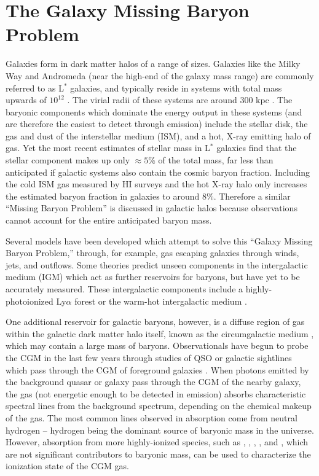 \section{The Galaxy Missing Baryon Problem}
\label{sec:Missing.Galaxies}

Galaxies form in dark matter halos of a range of sizes. Galaxies like
the Milky Way and Andromeda (near the high-end of the galaxy mass
range) are commonly referred to as L$^*$ galaxies, and typically
reside in systems with total mass upwards of $10^{12}$ \Msun{}
\citep{Moster2010}. The virial radii of these systems are around 300
kpc \citep[][and refs.~therein]{Werk2014}. The baryonic components
which dominate the energy output in these systems (and are therefore
the easiest to detect through emission) include the stellar disk, the
gas and dust of the interstellar medium (ISM), and a hot, X-ray
emitting halo of gas. Yet the most recent estimates of stellar mass in
L$^*$ galaxies \citep{Behroozi2010} find that the stellar component
makes up only $\approx5\%$ of the total mass, far less than
anticipated if galactic systems also contain the cosmic baryon
fraction. Including the cold ISM gas measured by HI surveys and the
hot X-ray halo \citep[][respectively]{Martin2010, Gupta2012} only
increases the estimated baryon fraction in galaxies to around
$8\%$. Therefore a similar ``Missing Baryon Problem'' is discussed in
galactic halos because observations cannot account for the entire
anticipated baryon mass. 

Several models have been developed which attempt to solve this
``Galaxy Missing Baryon Problem,'' through, for example, gas
escaping galaxies through winds, jets, and outflows. Some theories
predict unseen components in the intergalactic medium (IGM) which act
as further reservoirs for baryons, but have yet to be accurately
measured. These intergalactic components include a highly-photoionized
Ly$\alpha$ forest \citep{Sargent1980, Cen1994} or the warm-hot
intergalactic medium \citep[WHIM][]{Cen1999, Dave1999}. 

One additional reservoir for galactic baryons, however, is a diffuse
region of gas within the galactic dark matter halo itself, known as
the circumgalactic medium \citep[CGM, first suggested
  by][]{Bahcall1969, Bergeron1985, Lanzetta1995}, which may contain a
large mass of baryons. Observationals have begun to probe the
CGM in the last few years through studies of QSO or galactic
sightlines which pass through the CGM of foreground
galaxies \citep{Steidel2010, Prochaska2011, Tumlinson2011,
  Werk2013}. When photons emitted by the background quasar or galaxy
pass through the CGM of the nearby galaxy, the gas (not energetic
enough to be detected in emission) absorbs characteristic spectral
lines from the background spectrum, depending on the chemical makeup
of the gas. The most common lines observed in absorption come from
neutral hydrogen -- hydrogen being the dominant source of baryonic
mass in the universe. However, absorption from more highly-ionized
species, such as  \citep{Zhu2013}, ,
, , and  \citep{Tumlinson2011,
  Werk2014}, which are not significant contributors to baryonic mass,
can be used to characterize the ionization state of the CGM gas.

